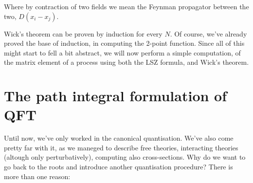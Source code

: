 \documentclass{report}
\begin{document}
Where by contraction of two fields we mean the Feynman propagator between the two, \(D(x_i-x_j)\). 

Wick's theorem can be proven by induction for every \(N\). Of course, we've already proved the base of induction, in computing the 2-point function. Since all of this might start to fell a bit abstract, we will now perform a simple computation, of the matrix element of a process using both the LSZ formula, and Wick's theorem. 




\chapter{The path integral formulation of QFT}

Until now, we've only worked in the canonical quantisation. We've also come pretty far with it, as we maneged to describe free theories, interacting theories (altough only perturbatively), computing also cross-sections. Why do we want to go back to the roots and introduce another quantisation procedure? There is more than one reason: 
\end{document}
